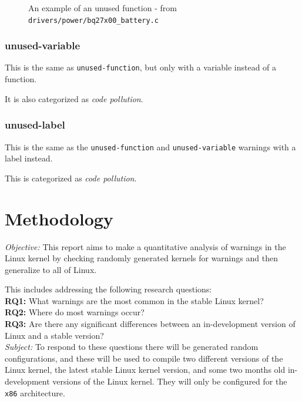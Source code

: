 \documentclass[a4paper,11pt]{report}
\newcommand{\figa}{
    \begin{figure}[!htpb]
    \centering
}
\newcommand{\figb}[2]{
    \caption{#1}
    \label{#2}
    \end{figure}
}
\begin{document}
\figa
    
\figb{An example of an unused function - from 
    \texttt{drivers/power/bq27x00\_battery.c}}{lst:unusedfuncreal}


            \subsection*{unused-variable}
This is the same as \texttt{unused-function}, but only with a variable instead 
of a function. 

It is also categorized as \emph{code pollution}.


            \subsection*{unused-label}
This is the same as the \texttt{unused-function} and \texttt{unused-variable} 
warnings with a label instead.

This is categorized as \emph{code pollution}.




\newpage
\chapter{Methodology}

\emph{Objective:}
This report aims to make a quantitative analysis of warnings in  the
Linux kernel by checking randomly generated  kernels for warnings and 
then generalize to all of Linux.

This includes addressing the following research questions:
\\

\textbf{RQ1:} What warnings are the most common in the stable Linux kernel?
\\

\textbf{RQ2:} Where do most warnings occur?
\\

\textbf{RQ3:} Are there any significant differences between an in-development 
version of Linux and a stable version?
\\

\emph{Subject:}
To respond to these questions there will be generated random configurations, 
and these will be used to compile two different versions of the Linux kernel, 
the latest stable Linux kernel version, and some two months old in-development 
versions of the Linux kernel. They will only be configured for the \texttt{x86} architecture.
\end{document}
